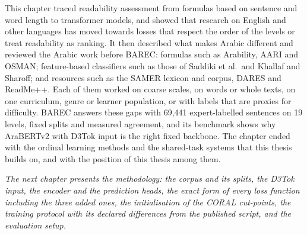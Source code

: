 This chapter traced readability assessment from formulas based on sentence and word length to
transformer models, and showed that research on English and other languages has moved towards
losses that respect the order of the levels or treat readability as ranking. It then described
what makes Arabic different and reviewed the Arabic work before BAREC: formulas such as
Arability, AARI and OSMAN; feature-based classifiers such as those of Saddiki et al.\ and Khallaf
and Sharoff; and resources such as the SAMER lexicon and corpus, DARES and ReadMe++. Each of them
worked on coarse scales, on words or whole texts, on one curriculum, genre or learner population,
or with labels that are proxies for difficulty. BAREC answers these gaps with 69{,}441
expert-labelled sentences on 19 levels, fixed splits and measured agreement, and its benchmark
shows why AraBERTv2 with D3Tok input is the right fixed backbone. The chapter ended with the
ordinal learning methods and the shared-task systems that this thesis builds on, and with the
position of this thesis among them.

\textit{The next chapter presents the methodology: the corpus and its splits, the D3Tok input, the
encoder and the prediction heads, the exact form of every loss function including the three added
ones, the initialisation of the CORAL cut-points, the training protocol with its declared
differences from the published script, and the evaluation setup.}
